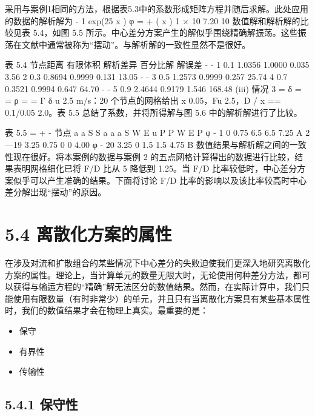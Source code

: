 \documentclass[11pt,a4paper,openany,fontset=none]{ctexbook}
\begin{document}
采用与案例1相同的方法，根据表5.3中的系数形成矩阵方程并随后求解。此处应用的数据的解析解为 - 1 exp(25 x ) φ = + ( x ) 1 × 10 7.20 10
数值解和解析解的比较见表 5.4，如图 5.5 所示。中心差分方案产生的解似乎围绕精确解振荡。这些振荡在文献中通常被称为“摆动”。与解析解的一致性显然不是很好。

表 5.4
节点距离 有限体积 解析差异 百分比解 解误差
- - 1 0.1 1.0356 1.0000 0.035 3.56 2 0.3 0.8694 0.9999 0.131 13.05 - - 3 0.5 1.2573 0.9999 0.257 25.74 4 0.7 0.3521 0.9994 0.647 64.70 - - 5 0.9 2.4644 0.9179 1.546 168.48
(iii) 情况 3 = δ = = ρ = = Γ δ u 2.5 m/s：20 个节点的网格给出 x 0.05，Fu 2.5，D / x == 0.1/0.05 2.0。表 5.5 总结了系数，并将所得解与图 5.6 中的解析解进行了比较。

表 5.5
= + - 节点 a a S S a a a S W E u P P W E P φ - 1 0 0.75 6.5 6.5 7.25 A 2—19 3.25 0.75 0 0 4.00 φ - 20 3.25 0 1.5 1.5 4.75 B
数值结果与解析解之间的一致性现在很好。将本案例的数据与案例 2 的五点网格计算得出的数据进行比较，结果表明网格细化已将 F/D 比从 5 降低到 1.25。当 F/D 比率较低时，中心差分方案似乎可以产生准确的结果。下面将讨论 F/D 比率的影响以及该比率较高时中心差分解出现“摆动”的原因。

\section*{5.4 离散化方案的属性}

在涉及对流和扩散组合的某些情况下中心差分的失败迫使我们更深入地研究离散化方案的属性。理论上，当计算单元的数量无限大时，无论使用何种差分方法，都可以获得与输运方程的“精确”解无法区分的数值结果。然而，在实际计算中，我们只能使用有限数量（有时非常少）的单元，并且只有当离散化方案具有某些基本属性时，我们的数值结果才会在物理上真实。最重要的是：

\begin{itemize}

\item 保守

\item 有界性

\item 传输性

\end{itemize}

\subsection*{5.4.1 保守性}
\end{document}
